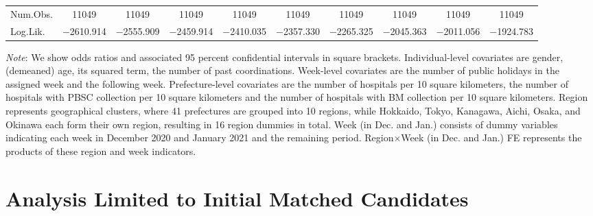 \documentclass[12pt, a4paper]{article}
\begin{document}
\begin{landscape}
\begin{table}[H]
\begin{threeparttable}
\begin{tabular}[t]{lccccccccc}
Num.Obs. & \num{11049} & \num{11049} & \num{11049} & \num{11049} & \num{11049} & \num{11049} & \num{11049} & \num{11049} & \num{11049}\\
Log.Lik. & \num{-2610.914} & \num{-2555.909} & \num{-2459.914} & \num{-2410.035} & \num{-2357.330} & \num{-2265.325} & \num{-2045.363} & \num{-2011.056} & \num{-1924.783}\\
\bottomrule
\end{tabular}
\begin{tablenotes}
\item \emph{Note}: We show odds ratios and associated 95 percent confidential intervals in square brackets. Individual-level covariates are gender, (demeaned) age, its squared term, the number of past coordinations. Week-level covariates are the number of public holidays in the assigned week and the following week. Prefecture-level covariates are the number of hospitals per 10 square kilometers, the number of hospitals with PBSC collection per 10 square kilometers and the number of hospitals with BM collection per 10 square kilometers. Region represents geographical clusters, where 41 prefectures are grouped into 10 regions, while Hokkaido, Tokyo, Kanagawa, Aichi, Osaka, and Okinawa each form their own region, resulting in 16 region dummies in total. Week (in Dec. and Jan.) consists of dummy variables indicating each week in December 2020 and January 2021 and the remaining period. Region$\times$Week (in Dec. and Jan.) FE represents the products of these region and week indicators.
\end{tablenotes}
\end{threeparttable}
\end{table}
\end{landscape}

\clearpage

\hypertarget{analysis-limited-to-initial-matched-candidates}{%
\section{Analysis Limited to Initial Matched Candidates}\label{analysis-limited-to-initial-matched-candidates}}
\end{document}
